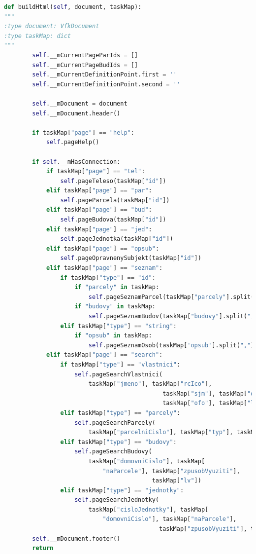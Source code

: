 \documentclass[a4paper,12pt,oneside]{book}
\begin{document}
\begin{lstlisting}[language=Python, 
		    keywordstyle=\color{blue}\ttfamily,
		    stringstyle=\color{red}\ttfamily,
		    commentstyle=\color{green}\ttfamily, morekeywords={qDebug,QString,QgsVectorLayer,QgsMapLayerRegistry,QMessageBox,self},
		    label=l_buildHtml]
def buildHtml(self, document, taskMap):
"""
:type document: VfkDocument
:type taskMap: dict
"""
        self.__mCurrentPageParIds = []
        self.__mCurrentPageBudIds = []
        self.__mCurrentDefinitionPoint.first = ''
        self.__mCurrentDefinitionPoint.second = ''

        self.__mDocument = document
        self.__mDocument.header()

        if taskMap["page"] == "help":
            self.pageHelp()

        if self.__mHasConnection:
            if taskMap["page"] == "tel":
                self.pageTeleso(taskMap["id"])
            elif taskMap["page"] == "par":
                self.pageParcela(taskMap["id"])
            elif taskMap["page"] == "bud":
                self.pageBudova(taskMap["id"])
            elif taskMap["page"] == "jed":
                self.pageJednotka(taskMap["id"])
            elif taskMap["page"] == "opsub":
                self.pageOpravnenySubjekt(taskMap["id"])
            elif taskMap["page"] == "seznam":
                if taskMap["type"] == "id":
                    if "parcely" in taskMap:
                        self.pageSeznamParcel(taskMap["parcely"].split(","))
                    if "budovy" in taskMap:
                        self.pageSeznamBudov(taskMap["budovy"].split(","))
                elif taskMap["type"] == "string":
                    if "opsub" in taskMap:
                        self.pageSeznamOsob(taskMap['opsub'].split(","))
            elif taskMap["page"] == "search":
                if taskMap["type"] == "vlastnici":
                    self.pageSearchVlastnici(
                        taskMap["jmeno"], taskMap["rcIco"],
                                             taskMap["sjm"], taskMap["opo"],
                                             taskMap["ofo"], taskMap["lv"])
                elif taskMap["type"] == "parcely":
                    self.pageSearchParcely(
                        taskMap["parcelniCislo"], taskMap["typ"], taskMap["druh"], taskMap["lv"])
                elif taskMap["type"] == "budovy":
                    self.pageSearchBudovy(
                        taskMap["domovniCislo"], taskMap[
                            "naParcele"], taskMap["zpusobVyuziti"],
                                          taskMap["lv"])
                elif taskMap["type"] == "jednotky":
                    self.pageSearchJednotky(
                        taskMap["cisloJednotky"], taskMap[
                            "domovniCislo"], taskMap["naParcele"],
                                            taskMap["zpusobVyuziti"], taskMap["lv"])
        self.__mDocument.footer()
        return
\end{lstlisting}
\end{document}
